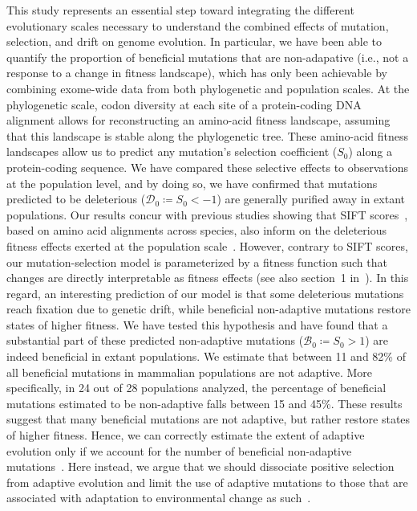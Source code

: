 \documentclass[10pt,letterpaper]{article}
\newcommand{\Sphy}{S_{0}}
\newcommand{\SphyDel}{\mathcal{D}_0}
\newcommand{\SphyBen}{\mathcal{B}_0}
\begin{document}
This study represents an essential step toward integrating the different evolutionary scales necessary to understand the combined effects of mutation, selection, and drift on genome evolution.
In particular, we have been able to quantify the proportion of beneficial mutations that are non-adapative (i.e., not a response to a change in fitness landscape), which has only been achievable by combining exome-wide data from both phylogenetic and population scales.
At the phylogenetic scale, codon diversity at each site of a protein-coding DNA alignment allows for reconstructing an amino-acid fitness landscape, assuming that this landscape is stable along the phylogenetic tree.
These amino-acid fitness landscapes allow us to predict any mutation’s selection coefficient ($\Sphy$) along a protein-coding sequence.
We have compared these selective effects to observations at the population level, and by doing so, we have confirmed that mutations predicted to be deleterious ($\SphyDel \coloneqq \Sphy < -1$) are generally purified away in extant populations.
Our results concur with previous studies showing that SIFT scores~\cite{ng_sift_2003, vaser_sift_2016}, based on amino acid alignments across species, also inform on the deleterious fitness effects exerted at the population scale~\cite{chen_hunting_2021}.
However, contrary to SIFT scores, our mutation-selection model is parameterized by a fitness function such that changes are directly interpretable as fitness effects (see also section~1 in~).
In this regard, an interesting prediction of our model is that some deleterious mutations reach fixation due to genetic drift, while beneficial non-adaptive mutations restore states of higher fitness.
We have tested this hypothesis and have found that a substantial part of these predicted non-adaptive mutations ($\SphyBen \coloneqq \Sphy > 1 $) are indeed beneficial in extant populations.
We estimate that between 11 and 82\% of all beneficial mutations in mammalian populations are not adaptive.
More specifically, in 24 out of 28 populations analyzed, the percentage of beneficial mutations estimated to be non-adaptive falls between 15 and 45\%.
These results suggest that many beneficial mutations are not adaptive, but rather restore states of higher fitness.
Hence, we can correctly estimate the extent of adaptive evolution only if we account for the number of beneficial non-adaptive mutations~\cite{keightley_what_2010, rice_evolutionarily_2015}.
Here instead, we argue that we should dissociate positive selection from adaptive evolution and limit the use of adaptive mutations to those that are associated with adaptation to environmental change as such~\cite{charlesworth_other_2007, mustonen_fitness_2009, mustonen_fitness_2010}.
\end{document}
